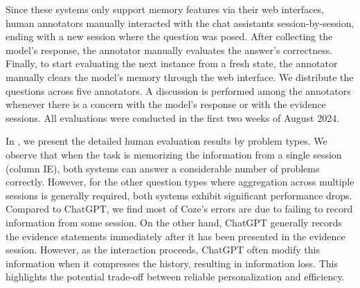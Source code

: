 Since these systems only support memory features via their web interfaces, human annotators manually interacted with the chat assistants session-by-session, ending with a new session where the question was posed. After collecting the model's response, the annotator manually evaluates the answer's correctness. Finally, to start evaluating the next instance from a fresh state, the annotator manually clears the model's memory through the web interface. We distribute the questions across five annotators. A discussion is performed among the annotators whenever there is a concern with the model's response or with the evidence sessions. All evaluations were conducted in the first two weeks of August 2024.

In , we present the detailed human evaluation results by problem types. We observe that when the task is memorizing the information from a single session (column IE), both systems can answer a considerable number of problems correctly. However, for the other question types where aggregation across multiple sessions is generally required, both systems exhibit significant performance drops. Compared to ChatGPT, we find most of Coze's errors are due to failing to record information from some session. On the other hand, ChatGPT generally records the evidence statements immediately after it has been presented in the evidence session. However, as the interaction proceeds, ChatGPT often modify this information when it compresses the history, resulting in information loss. This highlights the potential trade-off between reliable personalization and efficiency. 

\begin{table}[h]{
\caption{Human evaluation results of two systems categorized by evaluated ability types. We use the questions from single-session-user for the IE column. For the temporal reasoning column (TR), we use the questions that do not require reasoning with metadata.}
\centering
{}

\label{tab:commercial-system-detailed}
}
\end{table}


